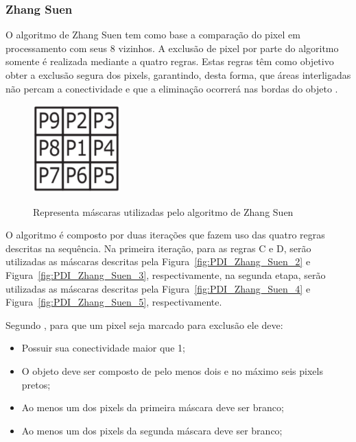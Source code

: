 \documentclass[12pt,oneside,a4paper,english,french,spanish,brazil,]{abntex2}
\begin{document}

\subsubsection{Zhang Suen}

O algoritmo de Zhang Suen \cite{zhang:1984} tem como base a comparação do pixel em processamento com seus 8 vizinhos. A exclusão de pixel por parte do algoritmo somente é realizada mediante a quatro regras. Estas regras têm como objetivo obter a exclusão segura dos pixels, garantindo, desta forma, que áreas interligadas não percam a conectividade e que a eliminação ocorrerá nas bordas do objeto \cite{guilherme:2007}.

\begin{figure}[ht]
\centering
\caption{Representa máscaras utilizadas pelo algoritmo de Zhang Suen}
\includegraphics[width=0.3\textwidth]{imagens/PDI_Zhang_Suen_1.PNG}
\label{fig:PDI_Zhang_Suen_1}
\end{figure}

O algoritmo é composto por duas iterações que fazem uso das quatro regras descritas na sequência. Na primeira iteração, para as regras C e D, serão utilizadas as máscaras descritas pela Figura~\ref{fig:PDI_Zhang_Suen_2} e Figura~\ref{fig:PDI_Zhang_Suen_3}, respectivamente, na segunda etapa, serão utilizadas as máscaras descritas pela Figura~\ref{fig:PDI_Zhang_Suen_4} e Figura~\ref{fig:PDI_Zhang_Suen_5}, respectivamente.

Segundo \citet{guilherme:2007}, para que um pixel seja marcado para exclusão ele deve:
\begin{itemize}
\item Possuir sua conectividade maior que 1;
\item O objeto deve ser composto de pelo menos dois e no máximo seis pixels pretos;
\item Ao menos um dos pixels da primeira máscara deve ser branco;
\item Ao menos um dos pixels da segunda máscara deve ser branco;
\end{itemize}
\end{document}
